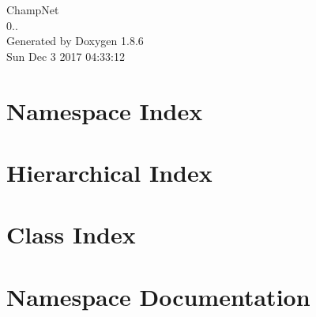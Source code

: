 \documentclass[twoside]{book}
\newcommand{\clearemptydoublepage}{%
  \newpage{\pagestyle{empty}\cleardoublepage}%
}
\begin{document}
\hypersetup{pageanchor=false}
\begin{titlepage}
\vspace*{7cm}
\begin{center}%
{\Large Champ\-Net \\[1ex]\large 0.. }\\
\vspace*{1cm}
{\large Generated by Doxygen 1.8.6}\\
\vspace*{0.5cm}
{\small Sun Dec 3 2017 04:33:12}\\
\end{center}
\end{titlepage}
\clearemptydoublepage
\tableofcontents
\clearemptydoublepage
{}
\hypersetup{pageanchor=true}

\chapter{Namespace Index}

\chapter{Hierarchical Index}

\chapter{Class Index}

\chapter{Namespace Documentation}


\end{document}
